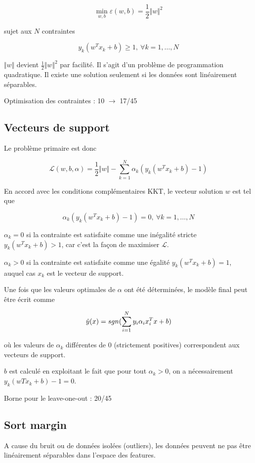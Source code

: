 	$$\min_{w, b} \varepsilon(w, b) = \frac{1}{2} \Vert w \Vert^2$$
	
	sujet aux $N$ contraintes
	
	$$y_k(w^T x_k + b) \geq 1, \: \forall k = 1, \dots , N$$

	$\Vert w \Vert$ devient $\frac{1}{2} \Vert w \Vert^2$ par facilité. Il s'agit d'un problème de programmation quadratique. Il existe une solution seulement si les données sont linéairement séparables.
	
	Optimisation des contraintes : 10 $\rightarrow$ 17/45
	
	\subsection{Vecteurs de support}
	
	Le problème primaire est donc
	
	$$\mathcal{L}(w, b, \alpha) = \frac{1}{2} \Vert w \Vert - \sum_{k = 1}^N \alpha_k (y_k (w^Tx_k + b) - 1)$$
	
	En accord avec les conditions complémentaires KKT, le vecteur solution $w$ est tel que
	
	$$\alpha_k (y_k (w^T x_k + b) - 1) = 0, \: \forall k = 1, \dots , N$$
	
	$\alpha_k = 0$ si la contrainte est satisfaite comme une inégalité stricte $y_k (w^T x_k + b) > 1$, car c'est la façon de maximiser $\mathcal{L}$.
	
	$\alpha_k > 0$ si la contrainte est satisfaite comme une égalité $y_k(w^Tx_k + b) = 1$, auquel cas $x_k$ est le vecteur de support.
	
	Une fois que les valeurs optimales de $\alpha$ ont été déterminées, le modèle final peut être écrit comme
	
	$$\hat{y}(x) = sgn(\sum_{i= 1}^N y_i \alpha_i x_i^T x + b)$$
	
	où les valeurs de $\alpha_k$ différentes de 0 (strictement positives) correspondent aux vecteurs de support.
	
	$b$ est calculé en exploitant le fait que pour tout $\alpha_k > 0$, on a nécessairement $y_k(wTx_k + b) - 1 = 0$.
	
	Borne pour le leave-one-out : 20/45
	
	\subsection{Sort margin}
	
	A cause du bruit ou de données isolées (outliers), les données peuvent ne pas être linéairement séparables dans l'espace des features. 
	
	
	